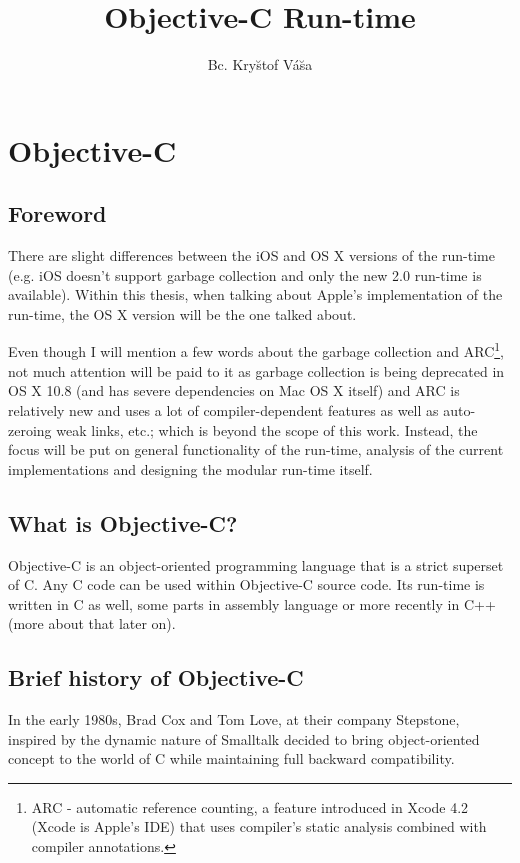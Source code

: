 \documentclass[a4paper, 11pt, fleqn]{book}
\begin{document}
\title{Objective-C Run-time}
\author{Bc. Kry\u{s}tof V\'{a}\u{s}a}
\date{}
\maketitle

\chapter{Objective-C}
\section{Foreword}

There are slight differences between the iOS and OS X versions of the run-time (e.g. iOS doesn't support garbage collection and only the new 2.0 run-time is available). Within this thesis, when talking about Apple's implementation of the run-time, the OS X version will be the one talked about.

Even though I will mention a few words about the garbage collection and ARC\footnote{ARC - automatic reference counting, a feature introduced in Xcode 4.2 (Xcode is Apple's IDE) that uses compiler's static analysis combined with compiler annotations.}, not much attention will be paid to it as garbage collection is being deprecated in OS X 10.8 (and has severe dependencies on Mac OS X itself) and ARC is relatively new and uses a lot of compiler-dependent features as well as auto-zeroing weak links, etc.; which is beyond the scope of this work. Instead, the focus will be put on general functionality of the run-time, analysis of the current implementations and designing the modular run-time itself.

\section{What is Objective-C?}

  Objective-C is an object-oriented programming language that is a strict superset of C. Any C code can be used within Objective-C source code. Its run-time is written in C as well, some parts in assembly language or more recently in C++ (more about that later on).
  
\section{Brief history of Objective-C}

In the early 1980s, Brad Cox and Tom Love, at their company Stepstone, inspired by the dynamic nature of Smalltalk decided to bring object-oriented concept to the world of C while maintaining full backward compatibility.
\end{document}
